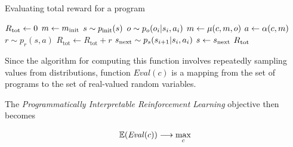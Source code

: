\begin{algorithm}[H]
\begin{algorithmic}[1]
\caption{Evaluating total reward for a program}
\State $R_\text{tot} \gets 0$
\State $m \gets m_\text{init}$
\State $s \sim p_\text{init}(s)$
\While{$\rlstate \in \rlnontermstates$}
\State $o \sim p_o(o_i | s_i, a_i)$
\State $m \gets \mu(c,m,o)$
\State $a \gets \alpha(c, m)$ 
\State $r \sim p_r(s,a)$
\State $R_\text{tot} \gets R_\text{tot} + r$
\State $s_\text{next} \sim p_s(s_{i+1} | s_i, a_i)$
\State $s\gets s_\text{next}$
\EndWhile
\State \Return $R_\text{tot}$
\EndFunction
\end{algorithmic}
\end{algorithm}

Since the algorithm for computing this function involves repeatedly sampling values from distributions, function $\mathit{Eval}(c)$ is a mapping from the set of programs to the set of real-valued random variables.

The \emph{Programmatically Interpretable Reinforcement Learning} objective then becomes

\begin{equation}
    \mathbb{E}(\mathit{Eval}(c)) \longrightarrow \max_{c}
    \label{eq:pirlgoal}
\end{equation}
